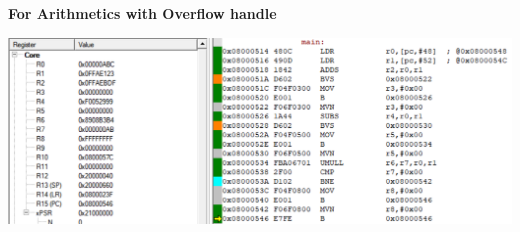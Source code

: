 \documentclass{article}
\begin{document}
\textbf{For Arithmetics with Overflow handle}\newline\newline
\begin{center}
    \includegraphics[width=1\textwidth]{Arithmetics_Overflow_After.png}
\end{center}
\end{document}
